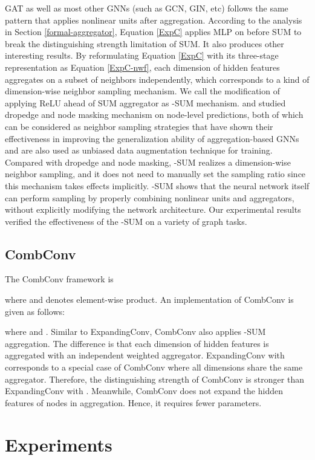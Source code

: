 \documentclass{article} \usepackage{iclr2021_conference,times}
\begin{document}
GAT as well as most other GNNs (such as GCN, GIN, etc) follows the same pattern that applies nonlinear units after aggregation.
According to the analysis in Section \ref{formal-aggregator},
Equation \ref{ExpC} applies MLP on  before SUM to break the distinguishing strength limitation of SUM.
It also produces other interesting results.
By reformulating Equation \ref{ExpC} with its three-stage representation as Equation \ref{ExpC-nwf},
each dimension of hidden features aggregates on a subset of neighbors independently,
which corresponds to a kind of dimension-wise neighbor sampling mechanism.
We call the modification of applying ReLU ahead of SUM aggregator as -SUM mechanism.
\citep{mishra2020node} and \citep{rong2019dropedge} studied dropedge and node masking mechanism on node-level predictions,
both of which can be considered as neighbor sampling strategies
that have shown their effectiveness in improving the generalization ability of aggregation-based GNNs and are also used as unbiased data augmentation technique for training.
Compared with dropedge and node masking,
-SUM realizes a dimension-wise neighbor sampling,
and it does not need to manually set the sampling ratio since this mechanism takes effects implicitly.
-SUM shows that the neural network itself can perform sampling by properly combining nonlinear units and aggregators,
without explicitly modifying the network architecture.
Our experimental results verified the effectiveness of the -SUM on a variety of graph tasks.

\subsection{CombConv}
The CombConv framework is

where  and  denotes element-wise product.
An implementation of CombConv is given as follows:

where  and .
Similar to ExpandingConv, CombConv also applies -SUM aggregation.
The difference is that each dimension of hidden features is aggregated with an independent weighted aggregator. ExpandingConv with  corresponds to a special case of CombConv where all dimensions share the same aggregator.
Therefore, the distinguishing strength of CombConv is stronger than ExpandingConv with .
Meanwhile, CombConv does not expand the hidden features of nodes in aggregation.
Hence, it requires fewer parameters.


\section{Experiments}
\end{document}
